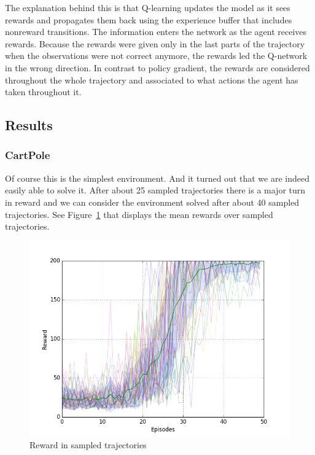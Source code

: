 \documentclass[10pt,a4paper]{article}
\begin{document}
The explanation behind this is that Q-learning updates the model as it sees rewards and propagates them back using the experience buffer that includes nonreward transitions. The information enters the network as the agent receives rewards. Because the rewards were given only in the last parts of the trajectory when the observations were not correct anymore, the rewards led the Q-network in the wrong direction. In contrast to policy gradient, the rewards are considered throughout the whole trajectory and associated to what actions the agent has taken throughout it.

\subsection{Results}

\subsubsection{CartPole}
Of course this is the simplest environment. And it turned out that we are indeed easily able to solve it. After about 25 sampled trajectories there is a major turn in reward and we can consider the environment solved after about 40 sampled trajectories. See Figure~\ref{fig:cartpole_reward} that displays the mean rewards over sampled trajectories.

\begin{figure}[!ht]
  \centering
  \includegraphics[width=1\textwidth]{./figures/cartpole_reward.png}
  \caption{Reward in sampled trajectories}
  \label{fig:cartpole_reward}
\end{figure}
\end{document}
